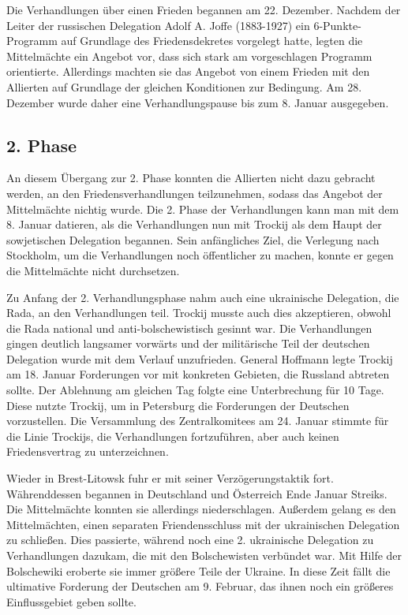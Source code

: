 \documentclass[12pt,headsepline,a4paper]{scrartcl}
\begin{document}
Die Verhandlungen über einen Frieden begannen am 22. Dezember. 
Nachdem der Leiter der russischen Delegation Adolf A. Joffe (1883-1927) ein 6-Punkte-Programm auf Grundlage des Friedensdekretes vorgelegt hatte, legten die Mittelmächte ein Angebot vor, dass sich stark am vorgeschlagen Programm orientierte. Allerdings machten sie das Angebot von einem Frieden mit den Allierten auf Grundlage der gleichen Konditionen zur Bedingung. Am 28. Dezember wurde daher eine Verhandlungspause bis zum 8. Januar ausgegeben.

\subsection{2. Phase}
An diesem Übergang zur 2. Phase konnten die Allierten nicht dazu gebracht werden, an den Friedensverhandlungen teilzunehmen, sodass das Angebot der Mittelmächte nichtig wurde. Die 2. Phase der Verhandlungen kann man mit dem 8. Januar datieren, als die Verhandlungen nun mit Trockij als dem Haupt der sowjetischen Delegation begannen. Sein anfängliches Ziel, die Verlegung nach Stockholm, um die Verhandlungen noch öffentlicher zu machen, konnte er gegen die Mittelmächte nicht durchsetzen.

Zu Anfang der 2. Verhandlungsphase nahm auch eine ukrainische Delegation, die Rada, an den Verhandlungen teil. Trockij musste auch dies akzeptieren, obwohl die Rada national und anti-bolschewistisch gesinnt war.
Die Verhandlungen gingen deutlich langsamer vorwärts und der militärische Teil der deutschen Delegation wurde mit dem Verlauf unzufrieden. General Hoffmann legte Trockij am 18. Januar Forderungen vor mit konkreten Gebieten, die Russland abtreten sollte. Der Ablehnung am gleichen Tag folgte eine Unterbrechung für 10 Tage. Diese nutzte Trockij, um in Petersburg die Forderungen der Deutschen vorzustellen. Die Versammlung des Zentralkomitees am 24. Januar stimmte für die Linie Trockijs, die Verhandlungen fortzuführen, aber auch keinen Friedensvertrag zu unterzeichnen.

Wieder in Brest-Litowsk fuhr er mit seiner Verzögerungstaktik fort. Währenddessen begannen in Deutschland und Österreich Ende Januar Streiks. Die Mittelmächte konnten sie allerdings niederschlagen. Außerdem gelang es den Mittelmächten, einen separaten Friendensschluss mit der ukrainischen Delegation zu schließen. Dies passierte, während noch eine 2. ukrainische Delegation zu Verhandlungen dazukam, die mit den Bolschewisten verbündet war. Mit Hilfe der Bolschewiki eroberte sie immer größere Teile der Ukraine. In diese Zeit fällt die ultimative Forderung der Deutschen am 9. Februar, das ihnen noch ein größeres Einflussgebiet geben sollte.
\end{document}
